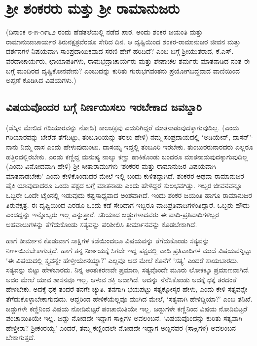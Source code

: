 \chapter{ಶ್ರೀ ಶಂಕರರು ಮತ್ತು ಶ್ರೀ ರಾಮಾನುಜರು}

(ದಿನಾಂಕ ೮-೫-೧೯೬೨ ರಂದು ಹೆಡತಲೆಯಲ್ಲಿ ನಡೆದ ಪಾಠ. ಅಂದು ಶಂಕರ ಜಯಂತಿ ಮತ್ತು ರಾಮಾನುಜಾಚಾರ್ಯರ ತಿರುನಕ್ಷತ್ರವೆರಡೂ ಸೇರಿದ ದಿನ. ಆ ದೃಷ್ಟಿಯಿಂದ ಶಂಕರ-ರಾಮಾನುಜರ ಜೀವನ ಮತ್ತು ದರ್ಶನಗಳ ನಿಷಯವಾಗಿ ಸಾಂಪ್ರದಾಯಿಕವಾದ ಸರಣಿ ಹೇಗೆ ಹರಿದಿದೆ? ಎಂಬ ಬಗ್ಗೆ  ಶ್ರೀಯುತರಾದ, ಕೆ.ಎಸ್. ವರದಾಚಾರ್ಯರು, ಛಾಯಾಪತಿಗಳು, ರಾಮಭದ್ರಾಚಾರ್ಯರು ಮತ್ತು ಶೇಷಾಚಲ ಶರ್ಮರು ಮಾತನಾಡಿದ ನಂತ ಈ ಬಗ್ಗೆ   ಮಂದಿರದ ದೃಷ್ಟಿಕೋನವೇನು? ಎಂಬುದನ್ನು ಕುರಿತು ಗುರುಭಗವಂತನು ಪ್ರಯೋಗಬದ್ಧವಾದ ವಾಣಿಯಿಂದ ಅಪ್ಪಣೆ ಕೊಡಿಸಿದ ವಿಷಯಗಳು.)

\section*{ವಿಷಯವೊಂದರ ಬಗ್ಗೆ ನಿರ್ಣಯಿಸಲು ಇರಬೇಕಾದ ಜವಬ್ದಾರಿ}

(ಡೆಸ್ಕಿನ ಮೇಲಿದ ಗಡಿಯಾರವನ್ನು ನೋಡಿ) ಕಾಲಚಕ್ರವು ಎದುರಿಗಿದ್ದರೆ ಮಾತನಾಡುವುದಕ್ಕಾಗುವುದಿಲ್ಲ. (ಎಂದು ಗರಿಯಾರವನ್ನು ಬೇರೆಡೆ ತೆಗೆದಿಟ್ಟು, ತಂಬೂರಿಯನ್ನು ತರಲು ಹೇಳಿ) ನಮ್ಮ ಸಂಪ್ರದಾಯದಲ್ಲಿ `ಅಡಿಯೇನ್, ದಾಸನ್'-ನಾನು ನಿಮ್ಮ ದಾಸ ಎಂದು ಹೇಳುವುದುಂಟು. ದಾಸಯ್ಯ  ಇದ್ದಲ್ಲಿ ತಂಬೂರಿ ಇರಬೇಕು. ತುಂಬುರರುನಾರದರು ಎಲ್ಲರೂ ಹತ್ತಿರದಲ್ಲಿರಬೇಕು. ಎರಡು ಕಣ್ಣಿದ್ದ ಮನುಷ್ಯ ನಾಲ್ಕು ಕಣ್ಣು ಹಾಕಿಕೊಂಡು ಬಂದರೂ ಮಾತನಾಡುವುದಕ್ಕಾಗುವುದಿಲ್ಲ (ಎಂದು ವಿನೋದವಾಗಿ ಹೇಳಿ) ಶ್ರೀ ಸೀತಾರಾಮುಗಳು `ಶಂಕರರ ಮತ್ತು ರಾಮಾನುಜರ ವಿಷಯವಾಗಿ ಮಾತನಾಡಬೇಕು' ಎಂದು ಕೇಳಿಕೊಂಡುದರ ಮೇಲೆ ಇಲ್ಲಿ ಬಂದು ಕುಳಿತದ್ದಾಗಿದೆ. ಶಂಕರರ ಅಥವಾ ರಾಮಾನುಜರ ಪೈಕಿ ಯಾವುದಾದರೂ ಒಂದು ಪಕ್ಷದ ಬಗ್ಗೆ ಮಾತನಾಡು ಎಂದು ಹೇಳಿದ್ದರೆ ಸುಲಭವಗಿತ್ತು. ಇಬ್ಬರ ಜೀವನವನ್ನೂ ಒಬ್ಬರೇ ಒಂದೇ ಟೈಂನಲ್ಲಿ ಇಡುವುದು ಕಷ್ಟಸಾಧ್ಯವಾದ ಅಂಶವಾಗಿದೆ. ಇಂದು ಶಂಕರ ಜಯಂತಿ ಹಾಗೂ ರಾಮಾನುಜರ ತಿರುನಕ್ಷತ್ರ. ಈ ದೃಷ್ಟಿಯಿಂದ ಎರಡೂ ಒಂದು ಕಡೆ ಸೇರಿದಾಗ ಇಬ್ಬರೂ ವಾದಿಪ್ರತಿವಾದಿಗಳಂತಿದ್ದಾರೆ. ಒಬ್ಬರು ಹೌದು ಎಂದದ್ದನ್ನು ಇನ್ನೊಬ್ಬರು ಇಲ್ಲ ಎನ್ನುತ್ತಾರೆ. ಸರಿಯಾದ ಜಡ್ಜುಗಳಾದವರು ಈ ವಾದಿ-ಪ್ರತಿವಾದಿಗಳಿಬ್ಬರ ಅಹವಾಲುಗಳನ್ನು ತೆಗೆದುಕೊಂಡು ಸತ್ಯವನ್ನು ಪರಿಶೀಲಿಸಿ ತೀರ್ಮಾನವನ್ನು ಕೊಡಬೇಕಾಗಿದೆ.

ಹಾಗೆ ತೀರ್ಮಾನ ಕೊಡುವಾಗ ಸಾಕ್ಷಿಗಳ ಕಡೆಯಿಂದಲೂ ವಿಷಯವನ್ನು ತೆಗೆದುಕೊಂಡು ಸತ್ಯವನ್ನು ನಿರ್ಣಯಿಸಬೇಕಾಗುತ್ತದೆ. ಹಾಗೆ ತನ್ನ ನಿರ್ಣಯಕ್ಕೆ ಸಿಗದೇ ಇದ್ದ ಪಕ್ಷದಲ್ಲಿ ವಾದಿ ಪ್ರತಿವಾದಿಗಳ ಮುದೆ ವಿಷಯವನ್ನಿಟ್ಟು `ಈ ವಿಷಯದಲ್ಲಿ ಸ್ತ್ಯವನ್ನೇ ಹೇಳ್ತೀಯೇನಯ್ಯಾ?' ಎಲ್ಲವೂ ಆದ ಮೇಲೆ ಕೊನೆಗೆ `ಸತ್ಯ' ಎಂದರೆ ಸಾಯಬಾರದು. ಸತ್ಯವನ್ನು ಬಿಟ್ಟು ಹೇಳಬಾರದು. ನಿನ್ನ ಅಂತಃಕರಣವೇ ಪ್ರಮಾಣ, ಸತ್ಯವೊಂದೇ ಮೂರು ಲೋಕಕ್ಕೂ ಪ್ರಮಾಣವಾಗಿದೆ. ಅದರ ಮೇಲೆ ಯಾವ ಶಾಸನವೂ ಇಲ್ಲ. ಆಳುವ ಶಕ್ತಿ ಅದಾಗಿದೆ. ಅದನ್ನು ನೆನೆಸಿಕೊಂಡು ಅದಕ್ಕೆ ಧಕ್ಕೆ ತರದಂತೆ ಹೇಳಬೇಕು. ಅದಕ್ಕೆ ಧಕ್ಕೆ ತಂದರೆ ತನಗೇ ಚ್ಯುತಿ. ತನಗಾಗಿ ಭಯಪಟ್ಟು ಸತ್ಯಕ್ಕೋಸ್ಕರ ಹೇಳು, ಎಂದು ಕೇಳಿ ಸತ್ಯವನ್ನೇ ತೆಗೆದುಕೊಳ್ಳಾಬೇಕಾಗುವುದು. ಆದ್ದರಿಂಡ ಹೇಳಿಕೆಯೆಲ್ಲವೂ ಮುಗಿದ ಮೇಲೆ, `ಸತ್ಯವಾಗಿ ಹೇಳಿದ್ದಿಯಾ?' ಎಂಬ ತನಿಖೆ. ಜಡ್ಜುಗಳೇ ಕಣ್ಣಿನಿಂದ ವಿಷಯ ನೋಡಿಬಿಟ್ಟರೆ ಪಂಚಾಯಿತಿಯೇ ಇಲ್ಲ. ಜಡ್ಜುಗಳೇ ಕಣ್ಣಿನಿಂದ ವಿಷಯ ನೋಡಿಬಿಟ್ಟರೆ ಪಂಚಾಯಿತಿಯೇ ಇಲ್ಲ. ಜಡ್ಜು ನೋಡದೇ ಇದ್ದಾಗ ಸಾಕ್ಷಿಗಳ ಅವಲಂಬನೆ. `ವಿಷಯವೊಂದನ್ನು ಕುರಿತು ಸತ್ಯವಾಗಿ ಹೇಳ್ತೀರಾ? ಶ್ರೀಕಂಠಯ್ಯ' ಎಂದರೆ, ತಮ್ಮ ಕಣ್ಣಿಂದಲೇ ನೋಡದೇ ಇದ್ದಾಗ ಅಣ್ಣನವರ (ಸಾಕ್ಷಿಗಳ) ಅವಲಂಬನ ಬೇಕಾಗುತ್ತದೆ.

